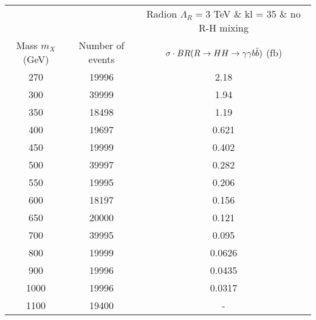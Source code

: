 \begin{tabular}{|c|c|c|}
\hline
   & & Radion $\Lambda_R = 3$ TeV \& kl = 35 \& no R-H mixing   \\ 
Mass $m_X$ (GeV) & Number of events & $\sigma \cdot BR(R\rightarrow HH \rightarrow \gamma\gamma b\bar{b})$ (fb) \\
\hline
270 & 19996& 2.18 \\
300 & 39999& 1.94\\
350 & 18498& 1.19 \\
400 & 19697& 0.621 \\
450 & 19999& 0.402 \\
500 & 39997& 0.282 \\
550 & 19995& 0.206 \\
600 & 18197& 0.156 \\
650 & 20000& 0.121 \\
700 & 39995& 0.095 \\
800 & 19999& 0.0626 \\
900 & 19996& 0.0435 \\
1000& 19996& 0.0317\\
1100& 19400& - \\
\end{tabular}
